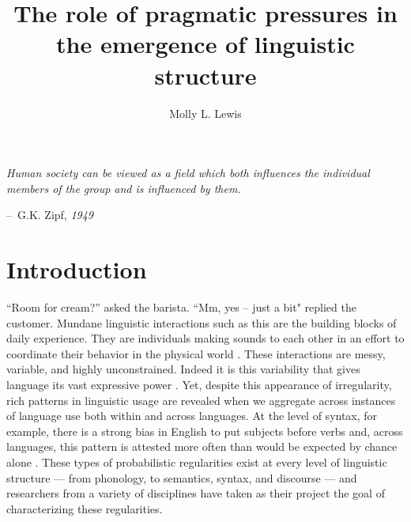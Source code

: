 \documentclass[man, noapacite, 12pt]{apa2}
\title{The role of pragmatic pressures in the emergence of linguistic structure}
\author{Molly L. Lewis}
\affiliation{Department of Psychology, Stanford University\\ Conceptual Analysis of Dissertation Area\\ 6 October 2014}
\makeatletter
\newenvironment{chapquote}[2][2em]
  {\setlength{\@tempdima}{#1}%
   \def\chapquote@author{#2}%
   \parshape 1 \@tempdima \dimexpr\textwidth-2\@tempdima\relax%
   \itshape}
  {\par\normalfont\hfill--\ \chapquote@author\hspace*{\@tempdima}\par\bigskip}
\makeatother
\begin{document}
\maketitle


\begin{chapquote}{G.K. Zipf, \textit{1949}}
\noindent  Human society can be viewed as a field which both influences the individual members of the group and is influenced by them. 
\end{chapquote}

\section{Introduction}
``Room for cream?'' asked the barista. ``Mm, yes -- just a bit" replied the customer. Mundane linguistic interactions such as this are the building blocks of daily experience. They are individuals making sounds to each other in an effort to coordinate their behavior in the physical world \cite{clark2006social}. These interactions are messy, variable, and highly unconstrained. Indeed it is this variability that gives language its vast expressive power \cite{hockett1960}. Yet, despite this appearance of irregularity, rich patterns in linguistic usage are revealed when we aggregate across instances of language use both within and across languages. At the level of syntax, for example, there is a strong bias in English to put subjects before verbs and, across languages, this pattern is attested more often than would be expected by chance alone  \cite{dryer2005order}. These types of probabilistic regularities exist at every level of linguistic structure --- from phonology, to semantics, syntax, and discourse --- and researchers from a variety of disciplines have taken as their project the goal of characterizing these regularities.
\end{document}

